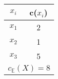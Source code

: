 \begin{tabular}{c|c}
	\multicolumn{1}{c|}{$x_i$} & c($x_i$) \\ \hline
	\multicolumn{1}{c|}{$x_1$} & 2        \\
	\multicolumn{1}{c|}{$x_2$} & 1        \\
	\multicolumn{1}{c|}{$x_3$} & 5        \\ \hline
	\multicolumn{2}{c}{$c_{\mathbb{E}}(X)=8$}         
\end{tabular}
